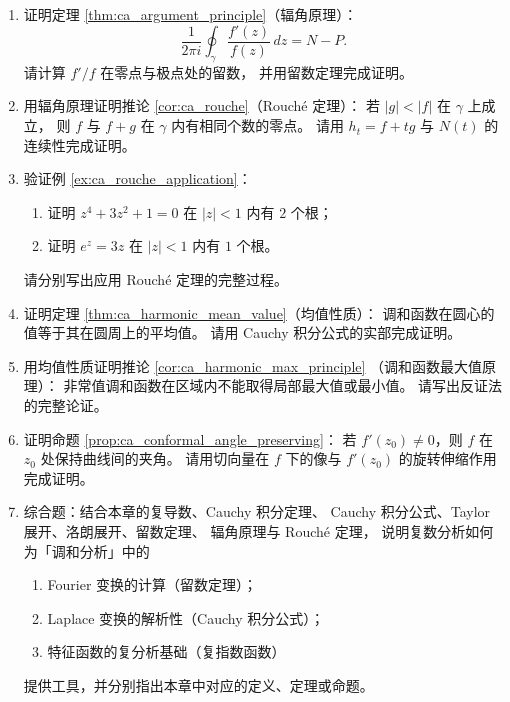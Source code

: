 \begin{enumerate}[leftmargin=3em, label=\textbf{题 \arabic*}]
    \item 证明定理 \ref{thm:ca_argument_principle}（辐角原理）：
    \[
    \frac{1}{2\pi i}\oint_\gamma\frac{f'(z)}{f(z)}\,dz=N-P.
    \]
    请计算 $f'/f$ 在零点与极点处的留数，
    并用留数定理完成证明。

    \item 用辐角原理证明推论 \ref{cor:ca_rouche}（Rouché 定理）：
    若 $|g|<|f|$ 在 $\gamma$ 上成立，
    则 $f$ 与 $f+g$ 在 $\gamma$ 内有相同个数的零点。
    请用 $h_t=f+tg$ 与 $N(t)$ 的连续性完成证明。

    \item 验证例 \ref{ex:ca_rouche_application}：
    \begin{enumerate}[label=(\roman*)]
        \item 证明 $z^4+3z^2+1=0$ 在 $|z|<1$ 内有 $2$ 个根；
        \item 证明 $e^z=3z$ 在 $|z|<1$ 内有 $1$ 个根。
    \end{enumerate}
    请分别写出应用 Rouché 定理的完整过程。

    \item 证明定理 \ref{thm:ca_harmonic_mean_value}（均值性质）：
    调和函数在圆心的值等于其在圆周上的平均值。
    请用 Cauchy 积分公式的实部完成证明。

    \item 用均值性质证明推论 \ref{cor:ca_harmonic_max_principle}
    （调和函数最大值原理）：
    非常值调和函数在区域内不能取得局部最大值或最小值。
    请写出反证法的完整论证。

    \item 证明命题 \ref{prop:ca_conformal_angle_preserving}：
    若 $f'(z_0)\neq 0$，则 $f$ 在 $z_0$ 处保持曲线间的夹角。
    请用切向量在 $f$ 下的像与 $f'(z_0)$ 的旋转伸缩作用完成证明。

    \item 综合题：结合本章的复导数、Cauchy 积分定理、
    Cauchy 积分公式、Taylor 展开、洛朗展开、留数定理、
    辐角原理与 Rouché 定理，
    说明复数分析如何为「调和分析」中的
    \begin{enumerate}[label=(\roman*)]
        \item Fourier 变换的计算（留数定理）；
        \item Laplace 变换的解析性（Cauchy 积分公式）；
        \item 特征函数的复分析基础（复指数函数）
    \end{enumerate}
    提供工具，并分别指出本章中对应的定义、定理或命题。

\end{enumerate}

